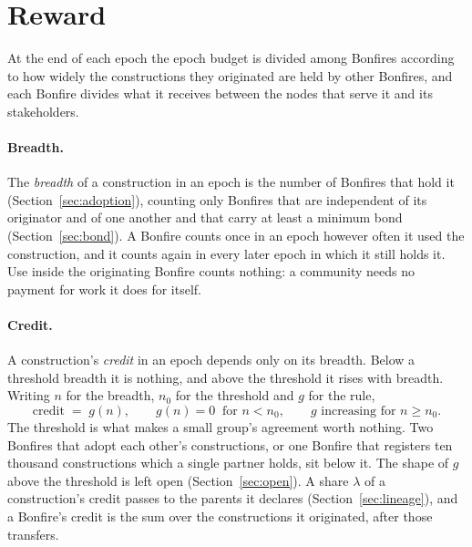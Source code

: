 \section{Reward}\label{sec:reward}

At the end of each epoch the epoch budget is divided among Bonfires according to how widely the constructions they
originated are held by other Bonfires, and each Bonfire divides what it receives between the nodes that serve it
and its stakeholders.

\paragraph{Breadth.} The \emph{breadth} of a construction in an epoch is the number of Bonfires that hold it
(Section~\ref{sec:adoption}), counting only Bonfires that are independent of its originator and of one another and
that carry at least a minimum bond (Section~\ref{sec:bond}). A Bonfire counts once in an epoch however often it
used the construction, and it counts again in every later epoch in which it still holds it. Use inside the
originating Bonfire counts nothing: a community needs no payment for work it does for itself.

\paragraph{Credit.} A construction's \emph{credit} in an epoch depends only on its breadth. Below a threshold
breadth it is nothing, and above the threshold it rises with breadth. Writing $n$ for the breadth, $n_0$ for the
threshold and $g$ for the rule,
\begin{equation}\label{eq:credit}
  \text{credit} \;=\; g(n), \qquad g(n) = 0 \ \text{ for } n < n_0, \qquad g \text{ increasing for } n \ge n_0 .
\end{equation}
The threshold is what makes a small group's agreement worth nothing. Two Bonfires that adopt each other's
constructions, or one Bonfire that registers ten thousand constructions which a single partner holds, sit below it.
The shape of $g$ above the threshold is left open (Section~\ref{sec:open}). A share $\lambda$ of a construction's
credit passes to the parents it declares (Section~\ref{sec:lineage}), and a Bonfire's credit is the sum over the
constructions it originated, after those transfers.

